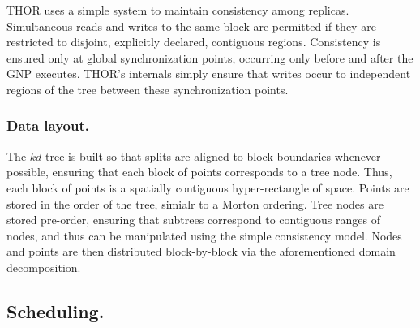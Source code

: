 \documentclass[twoside,leqno,twocolumn]{article}
\newcommand{\mysubsub}[1]{\subsubsection{#1.}}
\newcommand{\mysub}[1]{\subsection{#1.}}
\begin{document}
THOR uses a simple system to maintain consistency among replicas.
Simultaneous reads and writes to the same block are permitted if they are restricted to disjoint, explicitly declared, contiguous regions.
Consistency is ensured only at global synchronization points, occurring only before and after the GNP executes.
THOR's internals simply ensure that writes occur to independent regions of the tree between these synchronization points.




\mysubsub{Data layout}
The $kd$-tree is built so that splits are aligned to block boundaries whenever possible, ensuring that each block of points corresponds to a tree node.
Thus, each block of points is a spatially contiguous hyper-rectangle of space.
Points are stored in the order of the tree, simialr to a Morton ordering.
Tree nodes are stored pre-order, ensuring that subtrees correspond to contiguous ranges of nodes, and thus can be manipulated using the simple consistency model.
Nodes and points are then distributed block-by-block via the aforementioned domain decomposition.

\mysub{Scheduling}
\end{document}
